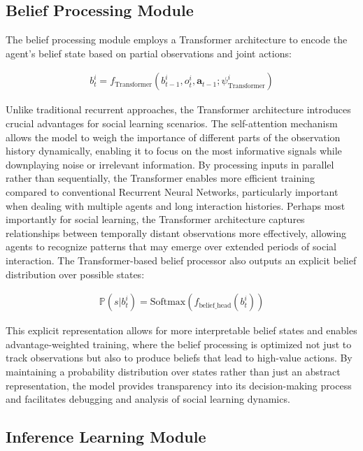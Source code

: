 \subsection{Belief Processing Module}

The belief processing module employs a Transformer architecture to encode the agent's belief state based on partial observations and joint actions:

\begin{align}
    b^i_t = f_{\text{Transformer}}(b^i_{t-1}, o^i_t, \boldsymbol{a}_{t-1}; \psi^i_{\text{Transformer}})
\end{align}

Unlike traditional recurrent approaches, the Transformer architecture introduces crucial advantages for social learning scenarios. The self-attention mechanism allows the model to weigh the importance of different parts of the observation history dynamically, enabling it to focus on the most informative signals while downplaying noise or irrelevant information. By processing inputs in parallel rather than sequentially, the Transformer enables more efficient training compared to conventional Recurrent Neural Networks, particularly important when dealing with multiple agents and long interaction histories. Perhaps most importantly for social learning, the Transformer architecture captures relationships between temporally distant observations more effectively, allowing agents to recognize patterns that may emerge over extended periods of social interaction. The Transformer-based belief processor also outputs an explicit belief distribution over possible states:

\begin{align}
    \mathbb{P}(s|b^i_t) = \text{Softmax}(f_{\text{belief\_head}}(b^i_t)) 
\end{align}

This explicit representation allows for more interpretable belief states and enables advantage-weighted training, where the belief processing is optimized not just to track observations but also to produce beliefs that lead to high-value actions. By maintaining a probability distribution over states rather than just an abstract representation, the model provides transparency into its decision-making process and facilitates debugging and analysis of social learning dynamics.

\subsection{Inference Learning Module}

